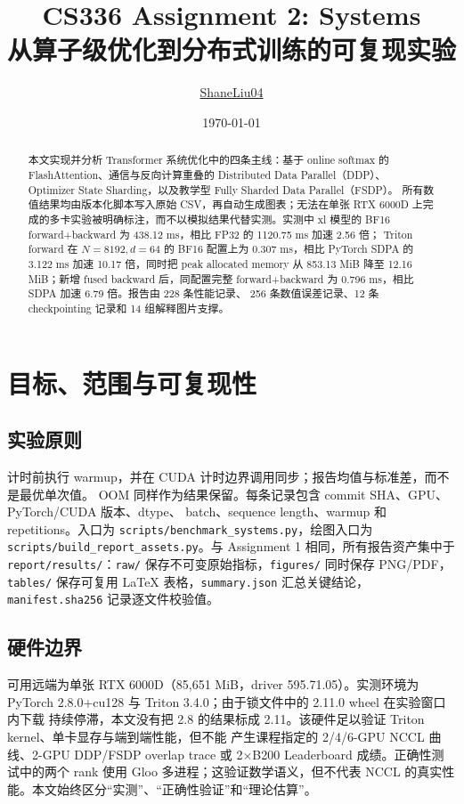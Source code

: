 \documentclass[11pt,a4paper]{ctexart}
\title{\textbf{CS336 Assignment 2: Systems}\\
\large 从算子级优化到分布式训练的可复现实验}
\author{\href{https://github.com/ShaneLiu04}{ShaneLiu04}}
\date{\today}
\begin{document}
\maketitle

\begin{abstract}
本文实现并分析 Transformer 系统优化中的四条主线：基于 online softmax 的
FlashAttention、通信与反向计算重叠的 Distributed Data Parallel（DDP）、
Optimizer State Sharding，以及教学型 Fully Sharded Data Parallel（FSDP）。
所有数值结果均由版本化脚本写入原始 CSV，再自动生成图表；无法在单张 RTX
6000D 上完成的多卡实验被明确标注，而不以模拟结果代替实测。实测中 xl 模型的 BF16
forward+backward 为 438.12 ms，相比 FP32 的 1120.75 ms 加速 2.56 倍；
Triton forward 在 $N=8192,d=64$ 的 BF16 配置上为 0.307 ms，相比 PyTorch
SDPA 的 3.122 ms 加速 10.17 倍，同时把 peak allocated memory 从
853.13 MiB 降至 12.16 MiB；新增 fused backward 后，同配置完整
forward+backward 为 0.796 ms，相比 SDPA 加速 6.79 倍。报告由 228 条性能记录、
256 条数值误差记录、12 条 checkpointing 记录和 14 组解释图片支撑。
\end{abstract}

\tableofcontents
\newpage

\section{目标、范围与可复现性}
\subsection{实验原则}
计时前执行 warmup，并在 CUDA 计时边界调用同步；报告均值与标准差，而不是最优单次值。
OOM 同样作为结果保留。每条记录包含 commit SHA、GPU、PyTorch/CUDA 版本、dtype、
batch、sequence length、warmup 和 repetitions。入口为
\texttt{scripts/benchmark\_systems.py}，绘图入口为
\texttt{scripts/build\_report\_assets.py}。与 Assignment 1 相同，所有报告资产集中于
\texttt{report/results/}：\texttt{raw/} 保存不可变原始指标，\texttt{figures/} 同时保存
PNG/PDF，\texttt{tables/} 保存可复用 LaTeX 表格，\texttt{summary.json} 汇总关键结论，
\texttt{manifest.sha256} 记录逐文件校验值。

\subsection{硬件边界}
可用远端为单张 RTX 6000D（85,651 MiB，driver 595.71.05）。实测环境为
PyTorch 2.8.0+cu128 与 Triton 3.4.0；由于锁文件中的 2.11.0 wheel 在实验窗口内下载
持续停滞，本文没有把 2.8 的结果标成 2.11。该硬件足以验证 Triton kernel、单卡显存与端到端性能，但不能
产生课程指定的 2/4/6-GPU NCCL 曲线、2-GPU DDP/FSDP overlap trace 或 2$\times$B200
Leaderboard 成绩。正确性测试中的两个 rank 使用 Gloo 多进程；这验证数学语义，但不代表
NCCL 的真实性能。本文始终区分``实测''、``正确性验证''和``理论估算''。
\end{document}
